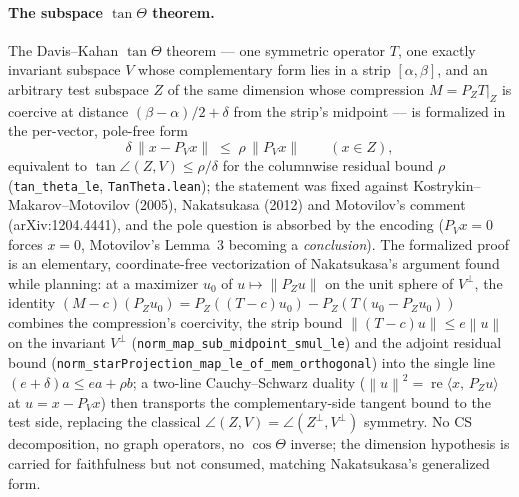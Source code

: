 \documentclass[11pt]{article}
\newcommand{\norm}[1]{\left\lVert #1\right\rVert}
\newcommand{\inner}[2]{\langle #1,\,#2\rangle}
\theoremstyle{remark}
\begin{document}
\paragraph{The subspace $\tan\Theta$ theorem.}  The Davis--Kahan
$\tan\Theta$ theorem --- one symmetric operator $T$, one exactly invariant
subspace $V$ whose complementary form lies in a strip $[\alpha,\beta]$, and an
arbitrary test subspace $Z$ of the same dimension whose compression
$M=P_ZT|_Z$ is coercive at distance $(\beta-\alpha)/2+\delta$ from the strip's
midpoint --- is formalized in the per-vector, pole-free form
\[
  \delta\,\norm{x-P_Vx}\;\le\;\rho\,\norm{P_Vx}\qquad(x\in Z),
\]
equivalent to $\tan\angle(Z,V)\le\rho/\delta$ for the columnwise residual
bound $\rho$ (\texttt{tan\_theta\_le}, \texttt{TanTheta.lean}); the statement
was fixed against Kostrykin--Makarov--Motovilov (2005), Nakatsukasa (2012) and
Motovilov's comment (arXiv:1204.4441), and the pole question is absorbed by
the encoding ($P_Vx=0$ forces $x=0$, Motovilov's Lemma~3 becoming a
\emph{conclusion}).  The formalized proof is an elementary, coordinate-free
vectorization of Nakatsukasa's argument found while planning: at a maximizer
$u_0$ of $u\mapsto\norm{P_Zu}$ on the unit sphere of $V^{\perp}$, the identity
$(M-c)(P_Zu_0)=P_Z((T-c)u_0)-P_Z(T(u_0-P_Zu_0))$ combines the compression's
coercivity, the strip bound $\norm{(T-c)u}\le e\norm{u}$ on the invariant
$V^{\perp}$ (\texttt{norm\_map\_sub\_midpoint\_smul\_le}) and the adjoint
residual bound (\texttt{norm\_starProjection\_map\_le\_of\_mem\_orthogonal})
into the single line $(e+\delta)a\le ea+\rho b$; a two-line Cauchy--Schwarz
duality ($\norm{u}^2=\operatorname{re}\inner{x}{P_Zu}$ at $u=x-P_Vx$) then transports
the complementary-side tangent bound to the test side, replacing the
classical $\angle(Z,V)=\angle(Z^{\perp},V^{\perp})$ symmetry.  No CS
decomposition, no graph operators, no $\cos\Theta$ inverse; the dimension
hypothesis is carried for faithfulness but not consumed, matching
Nakatsukasa's generalized form.
\end{document}
